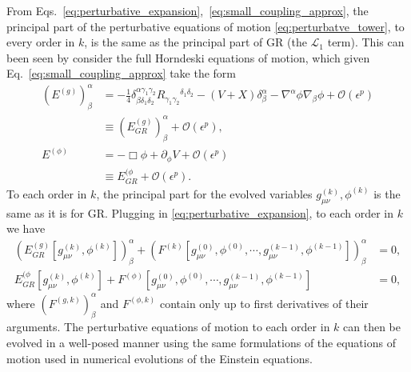 \documentclass{ws-ijmpd}
\begin{document}
From Eqs.~\eqref{eq:perturbative_expansion},~\eqref{eq:small_coupling_approx},
the principal part of the
perturbative equations of motion \eqref{eq:perturbatve_tower}, 
to every order in $k$, is the same as the principal part of GR 
(the $\mathcal{L}_1$ term).
This can been seen by consider the full Horndeski equations of motion,
which given Eq.~\eqref{eq:small_coupling_approx} take the form
\begin{align}
   \left(E^{(g)}\right)^{\alpha}_{\beta}
   &=
   -
   \frac{1}{4}\delta^{\alpha\gamma_1\gamma_2}_{\beta\delta_1\delta_2}
   R_{\gamma_1\gamma_2}{}^{\delta_1\delta_2}
   -
   \left(V+X\right)\delta^{\alpha}_{\beta}
   -
   \nabla^{\alpha}\phi\nabla_{\beta}\phi
   +
   \mathcal{O}\left(\epsilon^p\right)
   \nonumber\\
   &\equiv
   \left(E^{(g)}_{GR}\right)^{\alpha}_{\beta}
   +
   \mathcal{O}\left(\epsilon^p\right)
   ,\\
   E^{(\phi)}
   &=
   -
   \Box\phi
   +
   \partial_{\phi}V
   +
   \mathcal{O}\left(\epsilon^p\right)
   \nonumber\\
   &\equiv
   E^{(\phi}_{GR}
   +
   \mathcal{O}\left(\epsilon^p\right)
   .
\end{align}
To each order in $k$, the principal part for the evolved variables
$g^{(k)}_{\mu\nu},\phi^{(k)}$ is the same as it is for GR.
Plugging in \eqref{eq:perturbative_expansion}, to each order in $k$
we have
\begin{align}
   \left(
      E^{(g)}_{GR}
      \left[g^{(k)}_{\mu\nu},\phi^{(k)}\right]
   \right)^{\alpha}_{\beta}
   +
   \left(F^{(k)}\left[
      g^{(0)}_{\mu\nu},\phi^{(0)},
      \cdots,
      g^{(k-1)}_{\mu\nu},\phi^{(k-1)}
   \right]\right)^{\alpha}_{\beta}
   &=
   0
   ,\\
   E^{(\phi}_{GR}
   \left[g^{(k)}_{\mu\nu},\phi^{(k)}\right]
   +
   F^{(\phi)}\left[
      g^{(0)}_{\mu\nu},\phi^{(0)},
      \cdots,
      g^{(k-1)}_{\mu\nu},\phi^{(k-1)}
   \right]
   &=
   0
   ,
\end{align}
where $\left(F^{(g,k)}\right)^{\alpha}_{\beta}$ and
$F^{(\phi,k)}$ contain only up to first derivatives of their arguments.
The perturbative equations of motion to each order in $k$
can then be evolved in a well-posed manner using the same formulations
of the equations of motion used in numerical evolutions of
the Einstein equations.
\end{document}
